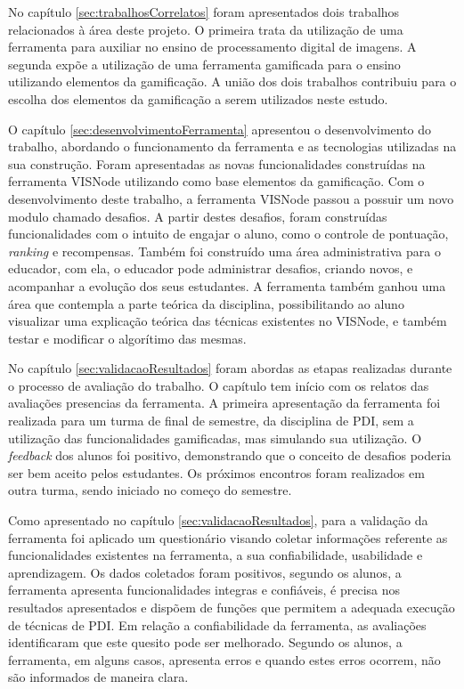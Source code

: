 \documentclass[
	12pt,				%
	oneside,			%
	a4paper,			%
	english,			%
	french,				%
	spanish,			%
	brazil,				%
	]{abntex2}
\begin{document}
No capítulo \ref{sec:trabalhosCorrelatos} foram apresentados dois trabalhos relacionados à área deste projeto. O primeira trata da utilização de uma ferramenta para auxiliar no ensino de processamento digital de imagens. A segunda expõe a utilização de uma ferramenta gamificada para o ensino utilizando elementos da gamificação. A união dos dois trabalhos contribuiu para o escolha dos elementos da gamificação a serem utilizados neste estudo.

O capítulo \ref{sec:desenvolvimentoFerramenta} apresentou o desenvolvimento do trabalho, abordando o funcionamento da ferramenta e as tecnologias utilizadas na sua construção. Foram apresentadas as novas funcionalidades construídas na ferramenta VISNode utilizando como base elementos da gamificação. Com o desenvolvimento deste trabalho, a ferramenta VISNode passou a possuir um novo modulo chamado desafios. A partir destes desafios, foram construídas funcionalidades com o intuito de engajar o aluno, como o controle de pontuação, \textit{ranking} e recompensas. Também foi construído uma área administrativa para o educador, com ela, o educador pode administrar desafios, criando novos, e acompanhar a evolução dos seus estudantes. A ferramenta também ganhou uma área que contempla a parte teórica da disciplina, possibilitando ao aluno visualizar uma explicação teórica das técnicas existentes no VISNode, e também testar e modificar o algorítimo das mesmas.

No capítulo \ref{sec:validacaoResultados} foram abordas as etapas realizadas durante o processo de avaliação do trabalho. O capítulo tem início com os relatos das avaliações presencias da ferramenta. A primeira apresentação da ferramenta foi realizada para um turma de final de semestre, da disciplina de PDI, sem a utilização das funcionalidades gamificadas, mas simulando sua utilização. O \textit{feedback} dos alunos foi positivo, demonstrando que o conceito de desafios poderia ser bem aceito pelos estudantes. Os próximos encontros foram realizados em outra turma, sendo iniciado no começo do semestre.

Como apresentado no capítulo \ref{sec:validacaoResultados}, para a validação da ferramenta foi aplicado um questionário visando coletar informações referente as funcionalidades existentes na ferramenta, a sua confiabilidade, usabilidade e aprendizagem. Os dados coletados foram positivos, segundo os alunos, a ferramenta apresenta funcionalidades integras e confiáveis, é precisa nos resultados apresentados e dispõem de funções que permitem a adequada execução de técnicas de PDI. Em relação a confiabilidade da ferramenta, as avaliações identificaram que este quesito pode ser melhorado. Segundo os alunos, a ferramenta, em alguns casos, apresenta erros e quando estes erros ocorrem, não são informados de maneira clara.
\end{document}
